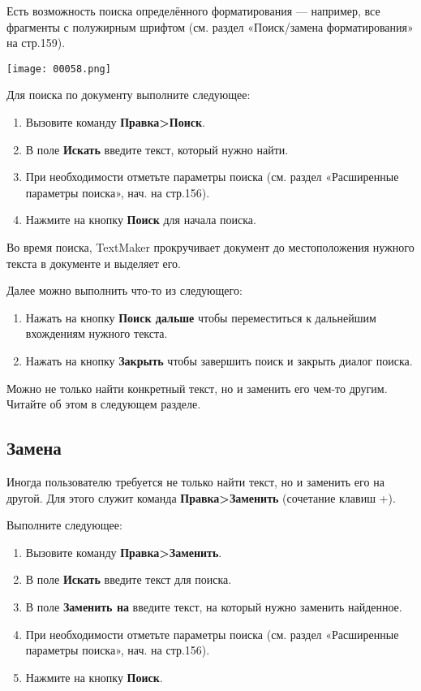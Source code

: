 \documentclass[a4paper,10pt]{article}
\begin{document}
Есть возможность поиска определённого форматирования --- например, все фрагменты с полужирным шрифтом (см. раздел «Поиск/замена форматирования» на стр.159).

\texttt{[image: 00058.png]}

Для поиска по документу выполните следующее:
\begin{enumerate}
 \item Вызовите команду \textbf{Правка>Поиск}.
 \item В поле \textbf{Искать} введите текст, который нужно найти.
 \item При необходимости отметьте параметры поиска (см. раздел «Расширенные параметры поиска», нач. на стр.156).
 \item Нажмите на кнопку \textbf{Поиск} для начала поиска.
\end{enumerate}

Во время поиска, TextMaker прокручивает документ до местоположения нужного текста в документе и выделяет его.

Далее можно выполнить что-то из следующего:
\begin{enumerate}[label=\Alph*]
\item Нажать на кнопку \textbf{Поиск дальше} чтобы переместиться к дальнейшим вхождениям нужного текста.
 \item Нажать на кнопку \textbf{Закрыть} чтобы завершить поиск и закрыть диалог поиска.
\end{enumerate}

Можно не только найти конкретный текст, но и заменить его чем-то другим. Читайте об этом в следующем разделе.

\subsection{Замена}
Иногда пользователю требуется не только найти текст, но и заменить его на другой. Для этого служит команда \textbf{Правка>Заменить} (сочетание клавиш +).

Выполните следующее:
\begin{enumerate}
 \item Вызовите команду \textbf{Правка>Заменить}.
 \item В поле \textbf{Искать} введите текст для поиска.
 \item В поле \textbf{Заменить на} введите текст, на который нужно заменить найденное.
 \item При необходимости отметьте параметры поиска (см. раздел «Расширенные параметры поиска», нач. на стр.156).
 \item Нажмите на кнопку \textbf{Поиск}.
\end{enumerate}
\end{document}
